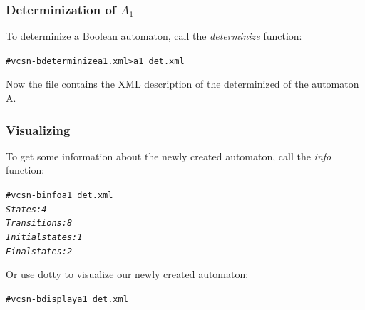 \subsubsection{Determinization of $A_1$}
To determinize a Boolean automaton, call the \textit{determinize}
function:
\begin{alltt}
# vcsn-b determinize a1.xml > a1\_det.xml
\end{alltt}
Now the file  contains the XML description of the
determinized of the automaton A.

\subsubsection{Visualizing}

To get some information about the newly created automaton, call the
\textit{info} function:
\begin{alltt}
# vcsn-b info a1\_det.xml
\textit{States: 4
Transitions: 8
Initial states: 1
Final states: 2}
\end{alltt}
Or use dotty to visualize our newly created automaton:
\begin{alltt}
# vcsn-b display a1\_det.xml
\end{alltt}

